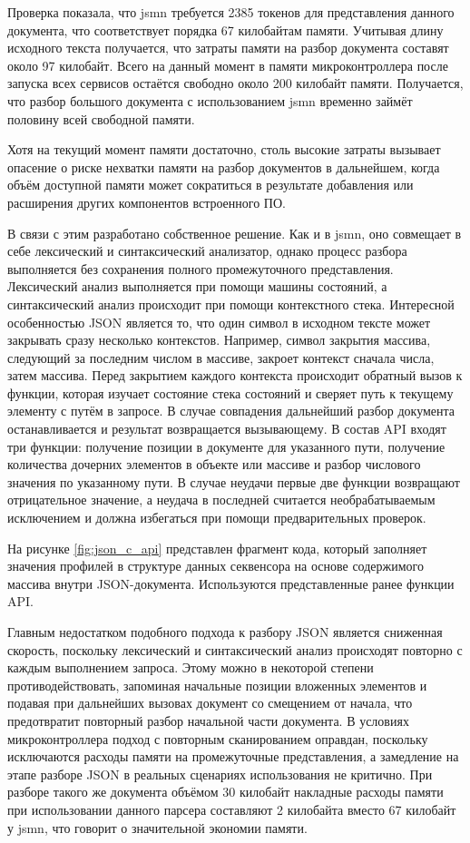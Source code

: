 \documentclass{report}
\begin{document}
Проверка показала, что jsmn требуется 2385 токенов для представления данного документа, что соответствует порядка 67 килобайтам памяти. Учитывая длину исходного текста получается, что затраты памяти на разбор документа составят около 97 килобайт. Всего на данный момент в памяти микроконтроллера после запуска всех сервисов остаётся свободно около 200 килобайт памяти. Получается, что разбор большого документа с использованием jsmn временно займёт половину всей свободной памяти.

Хотя на текущий момент памяти достаточно, столь высокие затраты вызывает опасение о риске нехватки памяти на разбор документов в дальнейшем, когда объём доступной памяти может сократиться в результате добавления или расширения других компонентов встроенного ПО.

В связи с этим разработано собственное решение. Как и в jsmn, оно совмещает в себе лексический и синтаксический анализатор, однако процесс разбора выполняется без сохранения полного промежуточного представления. Лексический анализ выполняется при помощи машины состояний, а синтаксический анализ происходит при помощи контекстного стека. Интересной особенностью JSON является то, что один символ в исходном тексте может закрывать сразу несколько контекстов. Например, символ закрытия массива, следующий за последним числом в массиве, закроет контекст сначала числа, затем массива. Перед закрытием каждого контекста происходит обратный вызов к функции, которая изучает состояние стека состояний и сверяет путь к текущему элементу с путём в запросе. В случае совпадения дальнейший разбор документа останавливается и результат возвращается вызывающему. В состав API входят три функции: получение позиции в документе для указанного пути, получение количества дочерних элементов в объекте или массиве и разбор числового значения по указанному пути. В случае неудачи первые две функции возвращают отрицательное значение, а неудача в последней считается необрабатываемым исключением и должна избегаться при помощи предварительных проверок.

На рисунке \ref{fig:json_c_api} представлен фрагмент кода, который заполняет значения профилей в структуре данных секвенсора на основе содержимого массива внутри JSON-документа. Используются представленные ранее функции API.


Главным недостатком подобного подхода к разбору JSON является сниженная скорость, поскольку лексический и синтаксический анализ происходят повторно с каждым выполнением запроса. Этому можно в некоторой степени противодействовать, запоминая начальные позиции вложенных элементов и подавая при дальнейших вызовах документ со смещением от начала, что предотвратит повторный разбор начальной части документа. В условиях микроконтроллера подход с повторным сканированием оправдан, поскольку исключаются расходы памяти на промежуточные представления, а замедление на этапе разборе JSON в реальных сценариях использования не критично. При разборе такого же документа объёмом 30 килобайт накладные расходы памяти при использовании данного парсера составляют 2 килобайта вместо 67 килобайт у jsmn, что говорит о значительной экономии памяти.
\end{document}
